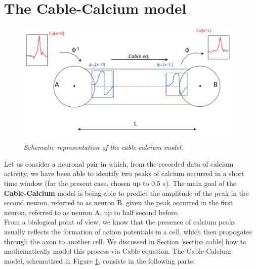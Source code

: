 \documentclass[12pt, a4paper]{report}
\begin{document}
\section{The Cable-Calcium model}

\begin{figure}[H]
	\begin{center}
		
		\includegraphics[scale=0.65]{cable_ca.png} 
	\end{center} 
	\caption{\textit{Schematic representation of the cable-calcium model.}}
	\label{cabel_ca}
\end{figure}

Let us consider a neuronal pair in which, from the recorded data of calcium activity, we have been able to identify two peaks of calcium occurred in a short time window (for the present case, chosen up to $0.5$ $s$). The main goal of the 
\textbf{Cable-Calcium} model is being able to predict the amplitude of the peak in the second neuron, referred to as neuron B, given the peak occurred in the first neuron, referred to as neuron A, up to half second before.\\
From a biological point of view, we know that the presence of calcium peaks usually reflects the formation of action potentials in a cell, which then propogates through the axon to another cell. We discussed in Section \ref{section cable} how to mathematically model this process via Cable equation. The Cable-Calcium model, schematized in Figure \ref{cabel_ca}, consists in the following parts:
\end{document}
